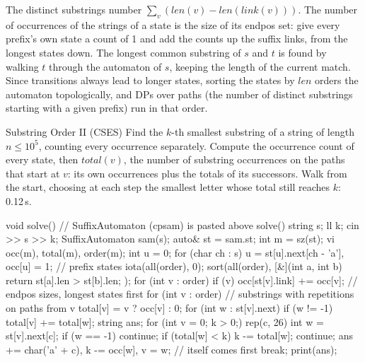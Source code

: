 \begin{fact}
The distinct substrings number $\sum_v (\mathit{len}(v) - \mathit{len}(\mathit{link}(v)))$. The number of occurrences of the strings of
a state is the size of its endpos set: give every prefix's own state a count of 1 and add the counts up the suffix links, from the
longest states down. The longest common substring of $s$ and $t$ is found by walking $t$ through the automaton of $s$, keeping the length
of the current match. Since transitions always lead to longer states, sorting the states by $\mathit{len}$ orders the automaton
topologically, and DPs over paths (the number of distinct substrings starting with a given prefix) run in that order.
\end{fact}

\begin{problem}{Substring Order II (CSES)}
Find the $k$-th smallest substring of a string of length $n \le 10^5$, counting every occurrence separately.
\solution Compute the occurrence count of every state, then $\mathit{total}(v)$, the number of substring occurrences on the paths that
start at $v$: its own occurrences plus the totals of its successors. Walk from the start, choosing at each step the smallest letter whose
total still reaches $k$: 0.12\,s.
\end{problem}

\begin{code}
void solve() {  // SuffixAutomaton (cpsam) is pasted above solve()
    string s;
    ll k;
    cin >> s >> k;
    SuffixAutomaton sam(s);
    auto& st = sam.st;
    int m = sz(st);
    vi occ(m), total(m), order(m);
    int u = 0;
    for (char ch : s) u = st[u].next[ch - 'a'], occ[u] = 1;  // prefix states
    iota(all(order), 0);
    sort(all(order), [&](int a, int b) { return st[a].len > st[b].len; });
    for (int v : order)
        if (v) occ[st[v].link] += occ[v];  // endpos sizes, longest states first
    for (int v : order) {  // substrings with repetitions on paths from v
        total[v] = v ? occ[v] : 0;
        for (int w : st[v].next)
            if (w != -1) total[v] += total[w];
    }
    string ans;
    for (int v = 0; k > 0;) {
        rep(c, 26) {
            int w = st[v].next[c];
            if (w == -1) continue;
            if (total[w] < k) {
                k -= total[w];
                continue;
            }
            ans += char('a' + c), k -= occ[w], v = w;  // itself comes first
            break;
        }
    }
    print(ans);
}
\end{code}

